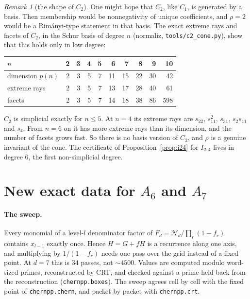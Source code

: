 \documentclass[11pt,a4paper]{article}
\theoremstyle{plain}
\theoremstyle{definition}
\theoremstyle{remark}
\newtheorem{remark}[theorem]{Remark}
\begin{document}
\begin{remark}[the shape of $C_2$]
One might hope that $C_2$, like $C_1$, is generated by a basis. Then membership would be
nonnegativity of unique coefficients, and $\rho = 2$ would be a Rim\'anyi-type statement in that
basis. The exact extreme rays and facets of $C_2$, in the Schur basis of degree $n$ (normaliz,
\texttt{tools/c2\_cone.py}), show that this holds only in low degree:
\begin{center}\small
\begin{tabular}{@{}lrrrrrrrrr@{}}
\toprule
$n$ & 2 & 3 & 4 & 5 & 6 & 7 & 8 & 9 & 10 \\
\midrule
dimension $p(n)$ & 2 & 3 & 5 & 7 & 11 & 15 & 22 & 30 & 42 \\
extreme rays & 2 & 3 & 5 & 7 & 13 & 17 & 28 & 40 & 61 \\
facets & 2 & 3 & 5 & 7 & 14 & 18 & 38 & 86 & 598 \\
\bottomrule
\end{tabular}
\end{center}
$C_2$ is simplicial exactly for $n \le 5$. At $n = 4$ its extreme rays are $s_{22}$, $s_{11}^2$,
$s_{31}$, $s_2 s_{11}$ and $s_4$. From $n = 6$ on it has more extreme rays than its dimension, and
the number of facets grows fast. So there is no basis version of $C_2$, and $\rho$ is a genuine
invariant of the cone. The certificate of Proposition~\ref{prop:i24} for $I_{2,4}$ lives in
degree $6$, the first non-simplicial degree.
\end{remark}



\section{New exact data for $A_6$ and $A_7$}\label{sec:data}

\paragraph{The sweep.} Every monomial of a level-$l$ denominator factor of $F_d = \mathcal N_d /
\prod_r(1 - f_r)$ contains $x_{l-1}$ exactly once. Hence $H = G + f H$ is a recurrence along one
axis, and multiplying by $1/(1 - f_r)$ needs one pass over the grid instead of a fixed point. At
$d = 7$ this is $34$ passes, not $\sim 4500$. Values are computed modulo word-sized primes,
reconstructed by CRT, and checked against a prime held back from the reconstruction
(\texttt{chernpp.boxes}). The sweep agrees cell by cell with the fixed point of
\texttt{chernpp.chern}, and packet by packet with \texttt{chernpp.crt}.
\end{document}
